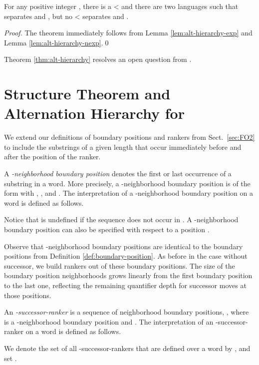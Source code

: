 \documentclass{LMCS}
\newcommand{\qedconf}{}
\renewcommand{\qedconf}{\qed}
\begin{document}
\begin{thm}
  \label{thm:alt-hierarchy}
  For any positive integer , there is a <
  and there are two languages  such that  separates
   and , but no < separates  and
  .
\end{thm}

\begin{full}
\begin{proof}
  The theorem immediately follows from Lemma \ref{lem:alt-hierarchy-exp}
  and Lemma \ref{lem:alt-hierarchy-nexp}.\qedconf
\end{proof}
\end{full}


Theorem \ref{thm:alt-hierarchy} resolves an open question from
\cite{EVW97,EVW02}.


\section{Structure Theorem and Alternation Hierarchy for \texorpdfstring{}{FOV[<,suc]{2}}}
\label{sec:FO2-suc}

We extend our definitions of boundary positions and rankers from 
Sect.~\ref{sec:FO2} to include the substrings of a given length that occur
immediately before and after the position of the ranker.

\begin{defi}
  A \emph{-neighborhood boundary position} denotes the first or
  last occurrence of a substring in a word. More precisely, a
  -neighborhood boundary position is of the form 
  with , ,  and . The interpretation of a -neighborhood boundary
  position  on a word  is defined
  as follows.
  
  Notice that  is undefined if the sequence 
  does not occur in
  . A -neighborhood boundary position can also be specified
  with respect to a position .
  
\end{defi}

Observe that -neighborhood boundary positions are identical to the
boundary positions from Definition \ref{def:boundary-position}. As before in
the case without successor, we build rankers out of these boundary
positions. The size of the boundary position neighborhoods grows linearly
from the first boundary position to the last one, reflecting the remaining
quantifier depth for successor moves at those positions.

\begin{defi}
  An \emph{-successor-ranker}  is a sequence of  neighborhood
  boundary positions, , where  is a
  -neighborhood boundary position and . The interpretation of an -successor-ranker  on a word
   is defined as follows.
  
  We denote the set of all -successor-rankers that are defined over a
  word  by , and set .
\end{defi}
\end{document}

